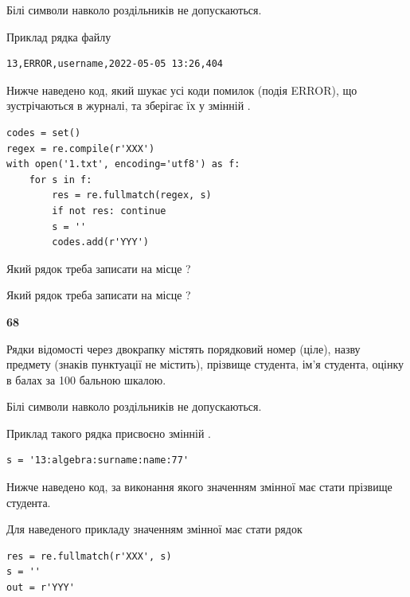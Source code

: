 Білі символи навколо роздільників не допускаються.

Приклад рядка файлу



\begin{verbatim}
13,ERROR,username,2022-05-05 13:26,404
\end{verbatim}


Нижче наведено код, який шукає усі коди помилок (подія ERROR), що зустріча\-ють\-ся в журналі, та зберігає їх у змінній .



\begin{verbatim}
codes = set()
regex = re.compile(r'XXX')
with open('1.txt', encoding='utf8') as f:
    for s in f:
        res = re.fullmatch(regex, s)
        if not res: continue
        s = ''
        codes.add(r'YYY')
\end{verbatim}





Який рядок треба записати на місце  ?\par
\vspace{5mm}


Який рядок треба записати на місце  ?\par


\newpage

{\begin {center}\textbf{ 68}\end {center}}\par
Рядки відомості через двокрапку містять порядковий номер (ціле), назву предмету (знаків пунктуації не містить), прізвище студента, ім'я студента, оцінку в балах за 100 бальною шкалою.

Білі символи навколо роздільників не допускаються.

Приклад такого рядка присвоєно змінній .



\begin{verbatim}
s = '13:algebra:surname:name:77'
\end{verbatim}


Нижче наведено код, за виконання якого значенням змінної  має стати прізвище студента.

Для наведеного прикладу значенням змінної  має стати рядок 



\begin{verbatim}
res = re.fullmatch(r'XXX', s)
s = ''
out = r'YYY'
\end{verbatim}


